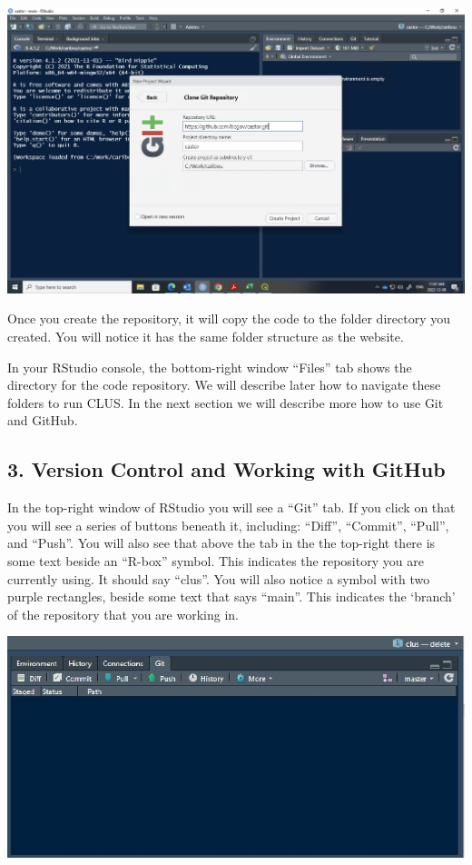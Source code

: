 \documentclass[
]{article}
\begin{document}
\includegraphics{images/git_repo.jpg}

Once you create the repository, it will copy the code to the folder
directory you created. You will notice it has the same folder structure
as the website.

In your RStudio console, the bottom-right window ``Files'' tab shows the
directory for the code repository. We will describe later how to
navigate these folders to run CLUS. In the next section we will describe
more how to use Git and GitHub.

\hypertarget{version-control-and-working-with-github}{%
\subsection{3. Version Control and Working with
GitHub}\label{version-control-and-working-with-github}}

In the top-right window of RStudio you will see a ``Git'' tab. If you
click on that you will see a series of buttons beneath it, including:
``Diff'', ``Commit'', ``Pull'', and ``Push''. You will also see that
above the tab in the the top-right there is some text beside an
``R-box'' symbol. This indicates the repository you are currently using.
It should say ``clus''. You will also notice a symbol with two purple
rectangles, beside some text that says ``main''. This indicates the
`branch' of the repository that you are working in.

\includegraphics{images/git_rstudio.jpg}
\end{document}
